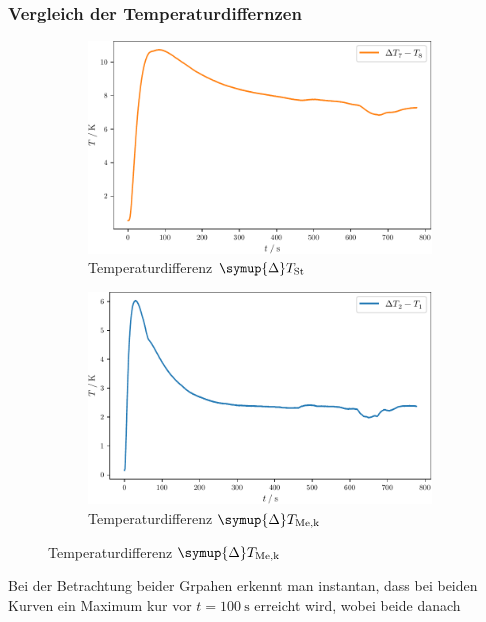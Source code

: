 \subsubsection{Vergleich der Temperaturdiffernzen}
\begin{figure}
  \begin{subfigure}{0.48\textwidth}
    \centering
    \includegraphics[width = \textwidth]{build/statDifSt.pdf}
    \caption{Temperaturdifferenz $\symup{\Delta}T_\text{St}$}
    \label{fig:statDifSt}
  \end{subfigure}
  \begin{subfigure}{0.48\textwidth}
    \centering
    \includegraphics[width = \textwidth]{build/statDifMek.pdf}
    \caption{Temperaturdifferenz $\symup{\Delta}T_\text{Me,k}$}
    \label{fig:statDifMek}
  \end{subfigure}
\end{figure}
Bei der Betrachtung beider Grpahen erkennt man instantan, dass bei beiden Kurven ein Maximum kur vor $t = \SI{100}{\second}$ erreicht wird, wobei beide danach 
